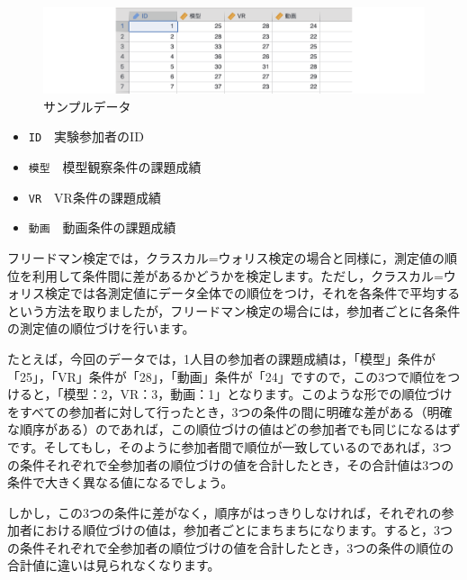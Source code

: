 \documentclass[
  12pt,
  a5jpaper,
  lualatex, ja=standard]{bxjsbook}
\providecommand{\tightlist}{%
  \setlength{\itemsep}{0pt}\setlength{\parskip}{0pt}}
\newenvironment{jmvvar}{%
	\begin{center}%
	\begin{tcolorbox}[%
		title=変数一覧,
		colframe=daidai,
		colbacktitle=daidai!30!white,
		coltitle=daidai!10!black,
		colback=daidai!2!white,
		breakable,
		width=.9\textwidth
		]\small\addtolength{\leftmargini}{-3\labelsep}%
	}%
	{\end{tcolorbox}\end{center}}
\begin{document}
\begin{figure}[!ht]

{\centering \includegraphics[width=1\linewidth]{images/ANOVA/data06} 

}

\caption{サンプルデータ}\label{fig:ANOVA-data06}
\end{figure}

\begin{jmvvar}

\begin{itemize}
\tightlist
\item
  \texttt{ID}　実験参加者のID
\item
  \texttt{模型}　模型観察条件の課題成績
\item
  \texttt{VR}　VR条件の課題成績
\item
  \texttt{動画}　動画条件の課題成績
\end{itemize}

\end{jmvvar}

フリードマン検定では，クラスカル=ウォリス検定の場合と同様に，測定値の順位を利用して条件間に差があるかどうかを検定します。ただし，クラスカル=ウォリス検定では各測定値にデータ全体での順位をつけ，それを各条件で平均するという方法を取りましたが，フリードマン検定の場合には，参加者ごとに各条件の測定値の順位づけを行います。

たとえば，今回のデータでは，1人目の参加者の課題成績は，「模型」条件が「25」，「VR」条件が「28」，「動画」条件が「24」ですので，この3つで順位をつけると，「模型：2，VR：3，動画：1」となります。このような形での順位づけをすべての参加者に対して行ったとき，3つの条件の間に明確な差がある（明確な順序がある）のであれば，この順位づけの値はどの参加者でも同じになるはずです。そしてもし，そのように参加者間で順位が一致しているのであれば，3つの条件それぞれで全参加者の順位づけの値を合計したとき，その合計値は3つの条件で大きく異なる値になるでしょう。

しかし，この3つの条件に差がなく，順序がはっきりしなければ，それぞれの参加者における順位づけの値は，参加者ごとにまちまちになります。すると，3つの条件それぞれで全参加者の順位づけの値を合計したとき，3つの条件の順位の合計値に違いは見られなくなります。
\end{document}
